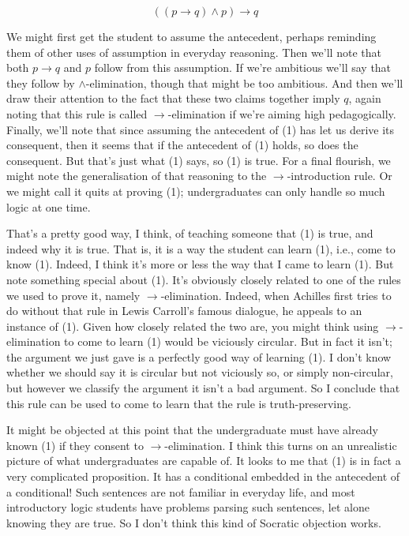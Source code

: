 \begin{equation}
((p \rightarrow q) \wedge p) \rightarrow q
\end{equation}

\noindent We might first get the student to assume the antecedent, perhaps reminding them of other uses of assumption in everyday reasoning. Then we'll note that both \(p \rightarrow q\) and \(p\) follow from this assumption. If we're ambitious we'll say that they follow by \(\wedge\)-elimination, though that might be too ambitious. And then we'll draw their attention to the fact that these two claims together imply \(q\), again noting that this rule is called \(\rightarrow\)-elimination if we're aiming high pedagogically. Finally, we'll note that since assuming the antecedent of (1) has let us derive its consequent, then it seems that if the antecedent of (1) holds, so does the consequent. But that's just what (1) says, so (1) is true. For a final flourish, we might note the generalisation of that reasoning to the \(\rightarrow\)-introduction rule. Or we might call it quits at proving (1); undergraduates can only handle so much logic at one time.

That's a pretty good way, I think, of teaching someone that (1) is true, and indeed why it is true. That is, it is a way the student can learn (1), i.e., come to know (1). Indeed, I think it's more or less the way that I came to learn (1). But note something special about (1). It's obviously closely related to one of the rules we used to prove it, namely \(\rightarrow\)-elimination. Indeed, when Achilles first tries to do without that rule in Lewis Carroll's famous dialogue, he appeals to an instance of (1). Given how closely related the two are, you might think using \(\rightarrow\)-elimination to come to learn (1) would be viciously circular. But in fact it isn't; the argument we just gave is a perfectly good way of learning (1). I don't know whether we should say it is circular but not viciously so, or simply non-circular, but however we classify the argument it isn't a bad argument. So I conclude that this rule can be used to come to learn that the rule is truth-preserving.

It might be objected at this point that the undergraduate must have already known (1) if they consent to \(\rightarrow\)-elimination. I think this turns on an unrealistic picture of what undergraduates are capable of. It looks to me that (1) is in fact a very complicated proposition. It has a conditional embedded in the antecedent of a conditional! Such sentences are not familiar in everyday life, and most introductory logic students have problems parsing such sentences, let alone knowing they are true. So I don't think this kind of Socratic objection works.

